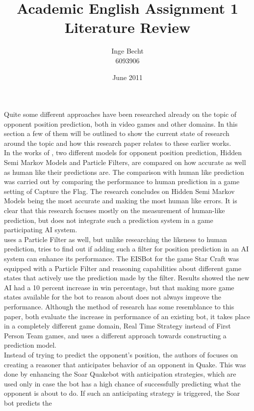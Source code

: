 \documentclass{article}
\title{Academic English Assignment 1 \\ Literature Review}
\author{Inge Becht \\ 6093906}
\date{June 2011}
\begin{document}
\maketitle
\clearpage

Quite some different approaches have been researched already on the topic of
opponent position prediction, both in video games and other domains. In this section a few of them will be
outlined to show the current state of research around the topic and how this
research paper relates to these earlier works.
\\
In the works of \citep{Hladky_anevaluation}, two different models for opponent
position prediction, Hidden Semi Markov Models and Particle Filters, are
compared on how accurate as well as human like their predictions are. The
comparison with human like prediction was carried out by comparing the performance to human
prediction in a game setting of Capture the Flag. The research
concludes on Hidden Semi Markov Models being the most accurate and
making the most human like errors. It is clear that this research focuses mostly on
the measurement of human-like prediction, but does not integrate such a
prediction system in a game participating AI system.
\\
\citep{weber2011aiide} uses a Particle Filter as well, but unlike
researching the likeness to human prediction, tries to find out if adding such a filter
for position prediction in an AI system can enhance its performance. The EISBot
for the game Star Craft was equipped with a Particle Filter and reasoning
capabilities about different game states that actively use the prediction made by the filter. Results
showed the new AI had a 10 percent increase in win percentage, but that
making more game states available for the bot to reason about does not always improve the
performance. Although the method of research has some resemblance to this
paper, both evaluate the increase in performance of an existing bot, it
takes place in a completely different game domain, Real Time Strategy instead of
First Person Team games, and uses a different approach
towards constructing a prediction model.
\\
Instead of trying to predict the opponent's position, the authors of
\citep{Laird:2001:KYG:375735.376343} focuses on creating a reasoner that
anticipates behavior of an opponent in Quake. This was done by enhancing the
Soar Quakebot with anticipation strategies, which are used only in case the bot
has a high chance of successfully predicting what the opponent is about to do.
If such an anticipating strategy is triggered, the Soar bot predicts the
\end{document}
